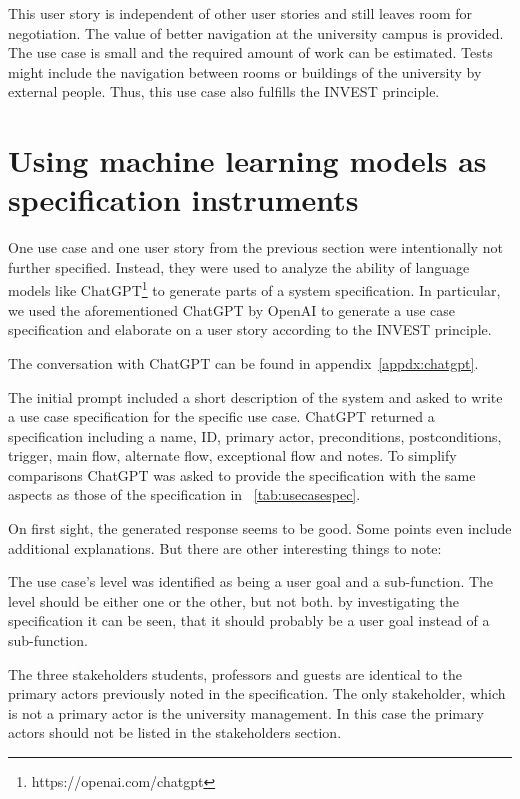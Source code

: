 \documentclass[conference,onecolumn]{IEEEtran}
\begin{document}
This user story is independent of other user stories and still leaves room for negotiation. The value of better navigation at the university campus is provided.
The use case is small and the required amount of work can be estimated. Tests might include the navigation between rooms or buildings of the university by external people.
Thus, this use case also fulfills the INVEST principle.

\section{Using machine learning models as specification instruments} \label{sec:chatgpt}

One use case and one user story from the previous section were intentionally not further specified. Instead, they were used to analyze the ability of language models like ChatGPT\footnote{https://openai.com/chatgpt} to generate parts of a system specification.
In particular, we used the aforementioned ChatGPT by OpenAI to generate a use case specification and elaborate on a user story according to the INVEST principle.

The conversation with ChatGPT can be found in appendix~\ref{appdx:chatgpt}.


The initial prompt included a short description of the system and asked to write a use case specification for the specific use case.
ChatGPT returned a specification including a name, ID, primary actor, preconditions, postconditions, trigger, main flow, alternate flow, exceptional flow and notes.
To simplify comparisons ChatGPT was asked to provide the specification with the same aspects as those of the specification in \tablename~\ref{tab:usecasespec}.

On first sight, the generated response seems to be good. Some points even include additional explanations. But there are other interesting things to note:

The use case's level was identified as being a user goal and a sub-function. The level should be either one or the other, but not both. by investigating the specification it can be seen, that it should probably be a user goal instead of a sub-function.

The three stakeholders students, professors and guests are identical to the primary actors previously noted in the specification. The only stakeholder, which is not a primary actor is the university management. In this case the primary actors should not be listed in the stakeholders section.
\end{document}
